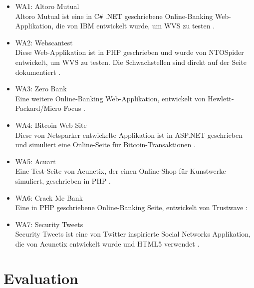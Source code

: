 \documentclass[12pt,oneside,a4paper,parskip]{scrbook}
\begin{document}
  \begin{itemize}
    \item WA1: Altoro Mutual\\
    Altoro Mutual ist eine in C\texttt{\#} .NET geschriebene Online-Banking Web-Applikation, die von IBM entwickelt wurde, um WVS zu testen \cite{Altoro}. %
    \item WA2: Webscantest\\
    Diese Web-Applikation ist in PHP geschrieben und wurde von NTOSpider entwickelt, um WVS zu testen. Die Schwachstellen sind direkt auf der Seite dokumentiert \cite{Webscantest}.
    \item WA3: Zero Bank\\
    Eine weitere Online-Banking Web-Applikation, entwickelt von Hewlett-Packard/Micro Focus \cite{Zero}.%
    \item WA4: Bitcoin Web Site\\
    Diese von Netsparker entwickelte Applikation ist in ASP.NET geschrieben und simuliert eine Online-Seite für Bitcoin-Transaktionen \cite{Aspnet}.
    \item WA5: Acuart\\
    Eine Test-Seite von Acunetix, der einen Online-Shop für Kunstwerke simuliert, geschrieben in PHP \cite{Acuart}.
    \item WA6: Crack Me Bank\\
    Eine in PHP geschriebene Online-Banking Seite, entwickelt von Trustwave \cite{CrackMeBank}:
    \item WA7: Security Tweets\\
    Security Tweets ist eine von Twitter inspirierte Social Networks Applikation, die von Acunetix entwickelt wurde und HTML5 verwendet \cite{Tweets}.
 \end{itemize}
\chapter{Evaluation}
\end{document}
